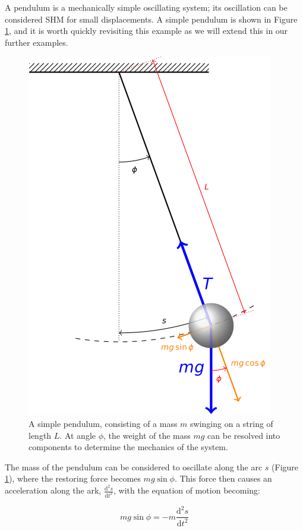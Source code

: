 \documentclass[
]{book}
\begin{document}
A pendulum is a mechanically simple oscillating system; its oscillation can be considered SHM for small displacements. A simple pendulum is shown in Figure \ref{fig:ch2-simplependulum1}, and it is worth quickly revisiting this example as we will extend this in our further examples.

\begin{figure}

{\centering \includegraphics[width=0.7\linewidth]{visualisations/LaTeX/ch2-simplependulum1} 

}

\caption{A simple pendulum, consisting of a mass $m$ swinging on a string of length $L$. At angle $\phi$, the weight of the mass $mg$ can be resolved into components to determine the mechanics of the system.}\label{fig:ch2-simplependulum1}
\end{figure}

The mass of the pendulum can be considered to oscillate along the arc \(s\) (Figure \ref{fig:ch2-simplependulum1}), where the restoring force becomes \(mg \sin \phi\). This force then causes an acceleration along the ark, \(\frac{\mathrm{d}^2 s}{\mathrm{d} t^2}\), with the equation of motion becoming:

\begin{equation}
mg \sin \phi = - m \frac{\mathrm{d}^2 s}{\mathrm{d} t^2}
\label{eq:ch2-simplependulum-a1}
\end{equation}
\end{document}
